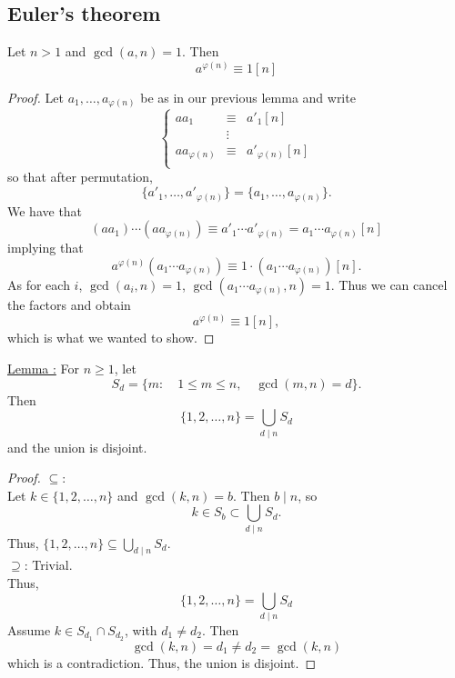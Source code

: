 \documentclass{report}
\begin{document}
\subsection*{Euler's theorem}
Let $n>1$ and $\gcd(a, n)=1$. Then 
\begin{equation*}
a^{\varphi(n)}\equiv 1 [n]
\end{equation*}
\begin{proof}
	Let $a_1, \dots, a_{\varphi(n)}$ be as in our previous lemma and write
	\begin{equation*}
	\left\{\begin{array}{lcl}
	aa_1 & \equiv & a'_1 [n]\\
	&\vdots\\
	aa_{\varphi(n)} & \equiv & a'_{\varphi(n)} [n]\\
	\end{array}\right.
	\end{equation*}
	so that after permutation, 
	\begin{equation*}
	\{a'_1, \dots, a'_{\varphi(n)}\} = \{a_1, \dots, a_{\varphi(n)}\}.
	\end{equation*}
We have that 
\begin{equation*}
(aa_1)\cdots(aa_{\varphi(n)})\equiv a'_1\cdots a'_{\varphi(n)}=a_1\cdots a_{\varphi(n)}[n]
\end{equation*}
implying that 
\begin{equation*}
a^{\varphi(n)}(a_1\cdots a_{\varphi(n)})\equiv 1\cdot (a_1\cdots a_{\varphi(n)}) [n].
\end{equation*}
As for each $i$, $\gcd(a_i, n)=1$, $\gcd(a_1\cdots a_{\varphi(n)}, n)=1$. Thus we can cancel the factors and obtain
\begin{equation*}
a^{\varphi(n)}\equiv 1[n],
\end{equation*}
which is what we wanted to show.
\end{proof}
\underline{Lemma :} For $n\geq 1$, let
\begin{equation*}
S_d = \{m: \quad 1\leq m\leq n,\quad \gcd(m, n)=d\}.
\end{equation*}
Then 
\begin{equation*}
\{1, 2, \dots, n\} = \bigcup_{d \mid n}S_d
\end{equation*}
and the union is disjoint.
\begin{proof}
	$\subseteq$:\\
	Let $k\in \{1, 2, \dots, n\}$ and $\gcd(k, n) = b$. Then $b\mid n$, so
	\begin{equation*}
	k\in S_b\subset \bigcup_{d \mid n}S_d.
	\end{equation*}
	Thus, $\{1, 2, \dots, n\} \subseteq \bigcup_{d \mid n}S_d$.\\
	$ \supseteq$: Trivial.\\
	Thus, 
\begin{equation*}
\{1, 2, \dots, n\} = \bigcup_{d \mid n}S_d
\end{equation*}
	Assume $k\in S_{d_1}\cap S_{d_2}$, with $d_1\neq d_2$. Then 
	\begin{equation*}
	\gcd(k, n) = d_1 \neq d_2 = \gcd(k, n)
	\end{equation*}
	which is a contradiction. Thus, the union is disjoint.
\end{proof}
\end{document}
